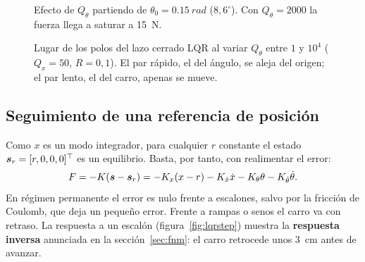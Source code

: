 \begin{figure}[H]
\centering
{}
\caption{Efecto de $Q_\theta$ partiendo de $\theta_0=\SI{0.15}{rad}$ ($8{,}6^\circ$). Con $Q_\theta=2000$ la fuerza llega a saturar a \SI{15}{N}.}
\label{fig:qsweep}
\end{figure}

\begin{figure}[H]
\centering
{}
\caption{Lugar de los polos del lazo cerrado LQR al variar $Q_\theta$ entre $1$ y $10^4$ ($Q_x=50$, $R=0{,}1$). El par rápido, el del ángulo, se aleja del origen; el par lento, el del carro, apenas se mueve.}
\label{fig:locus}
\end{figure}

\subsection{Seguimiento de una referencia de posición}
\label{sec:seguimiento}

Como $x$ es un modo integrador, para cualquier $r$ constante el estado $\bm{s}_r=[r,0,0,0]^\top$ es un equilibrio. Basta, por tanto, con realimentar el error:
\begin{equation}
F = -K(\bm{s}-\bm{s}_r) = -K_x(x-r) - K_{\dot{x}}\dot{x} - K_\theta\theta - K_{\dot{\theta}}\dot{\theta} .
\end{equation}
En régimen permanente el error es nulo frente a escalones, salvo por la fricción de Coulomb, que deja un pequeño error. Frente a rampas o senos el carro va con retraso. La respuesta a un escalón (figura~\ref{fig:lqrstep}) muestra la \textbf{respuesta inversa} anunciada en la sección~\ref{sec:fnm}: el carro retrocede unos \SI{3}{cm} antes de avanzar.

